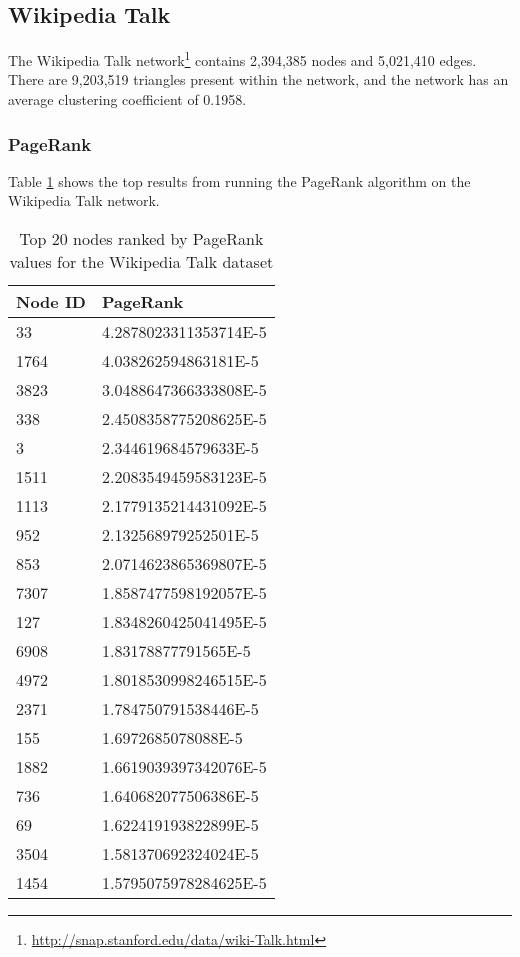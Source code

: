 \subsection{Wikipedia Talk}
The Wikipedia Talk network\footnote{\url{http://snap.stanford.edu/data/wiki-Talk.html}} contains 2,394,385 nodes and 5,021,410 edges. There are 9,203,519 triangles present within the network, and the network has an average clustering coefficient of 0.1958.

\subsubsection{PageRank}
Table \ref{tab:wikitalkpr} shows the top results from running the PageRank algorithm on the Wikipedia Talk network.

\begin{table}[htbp]%
\centering
\begin{tabular}{|l|l|}
\hline
Node ID & PageRank \\
\hline
33 & 4.2878023311353714E-5 \\
1764 & 4.038262594863181E-5 \\
3823 & 3.0488647366333808E-5 \\
338 & 2.4508358775208625E-5 \\
3 & 2.344619684579633E-5 \\
1511 & 2.2083549459583123E-5 \\
1113 & 2.1779135214431092E-5 \\
952 & 2.132568979252501E-5 \\
853 & 2.0714623865369807E-5 \\
7307 & 1.8587477598192057E-5 \\
127 & 1.8348260425041495E-5 \\
6908 & 1.83178877791565E-5 \\
4972 & 1.8018530998246515E-5 \\
2371 & 1.784750791538446E-5 \\
155 & 1.6972685078088E-5 \\
1882 & 1.6619039397342076E-5 \\
736 & 1.640682077506386E-5 \\
69 & 1.622419193822899E-5 \\
3504 & 1.581370692324024E-5 \\
1454 & 1.5795075978284625E-5 \\
\hline
\end{tabular}
\caption{Top 20 nodes ranked by PageRank values for the Wikipedia Talk dataset}
\label{tab:wikitalkpr}
\end{table}

